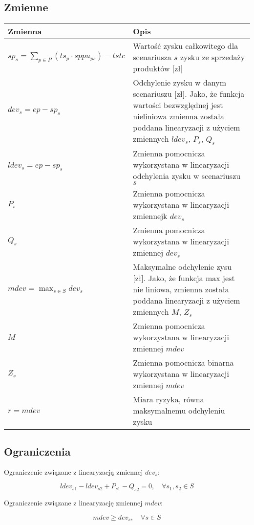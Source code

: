 \documentclass[12pt]{article}
\begin{document}
\subsection{Zmienne}

\begin{table}[h!]
\centering
\begin{tabular}{|l|p{10cm}|}
\hline
Zmienna & Opis \\
\hline
$sp_s = \sum_{p \in P} (ts_p \cdot sppu_{ps}) - tstc$ & Wartość zysku całkowitego dla scenariusza $s$ zysku ze sprzedaży produktów [zł] \\
\hline
$dev_s = ep - sp_s$ & Odchylenie zysku w danym scenariuszu [zł]. Jako, że funkcja wartości bezwzględnej jest nieliniowa zmienna została poddana linearyzacji z użyciem zmiennych $ldev_s$, $P_s$, $Q_s$ \\
\hline
$ldev_s = ep - sp_s$ & Zmienna pomocnicza wykorzystana w linearyzacji odchylenia zysku w scenariuszu $s$ \\
\hline
$P_s$ & Zmienna pomocnicza wykorzystana w linearyzacji zmiennejk $dev_s$ \\
\hline
$Q_s$ & Zmienna pomocnicza wykorzystana w linearyzacji zmiennej $dev_s$ \\
\hline
$mdev = \max_{s \in S} dev_s$ & Maksymalne odchylenie zysu [zł]. Jako, że funkcja max jest nie liniowa, zmienna została poddana linearyzacji z użyciem zmiennych $M$, $Z_s$ \\
\hline
$M$ & Zmienna pomocnicza wykorzystana w linearyzacji zmiennej $mdev$ \\
\hline
$Z_s$ & Zmienna pomocnicza binarna wykorzystana w linearyzacji zmiennej $mdev$ \\
\hline
$r = mdev$ & Miara ryzyka, równa maksymalnemu odchyleniu zysku \\
\hline
\end{tabular}
\end{table}

\subsection{Ograniczenia}

Ograniczenie związane z linearyzacją zmiennej $dev_s$:

$$lde v_{s1} - lde v_{s2} + P_{s1} - Q_{s2} = 0, \quad \forall s_1, s_2 \in S$$

Ograniczenie związane z linearyzację zmiennej $mdev$:

$$mdev \geqslant dev_s, \quad \forall s \in S$$
\end{document}
